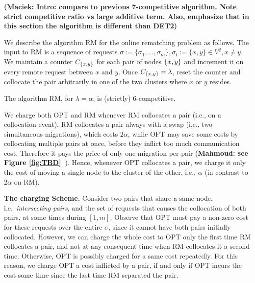 \documentclass[manuscript,screen=true, review, anonymous]{acmart}
\newcommand{\OPT}{\textsf{OPT}\xspace}
\newcommand{\RM}{\textsf{RM}\xspace} %
\DeclarePairedDelimiter\set{\{}{\}}
\newcommand\mahmoud[1]{\color{orange}\textbf{Mahmoud: #1~}\color{black}}
\newcommand\maciek[1]{\color{brown}\textbf{(Maciek: #1)}\color{black}}
\begin{document}
\maciek{Intro: compare to previous 7-competitive algorithm. Note strict competitive ratio vs large additive term. Also, emphasize that in this section the algorithm is different than DET2}

We describe the algorithm \RM for the online rematching problem as follows.
The input to \RM is a sequence of  requests
$\sigma:=\{\sigma_1,\dots, \sigma_m\}, \sigma_t:=\{x,y\} \in V^2, x \neq y$.
We maintain a counter $C_{\set{x,y}}$ for each pair of nodes $\set{x,y}$ and increment it on every remote request between $x$ and $y$.
Once $C_{\set{x,y}} = \lambda$,
reset the counter and collocate the pair arbitrarily in one of the two clusters where $x$ or $y$ resides.

\begin{theorem} \label{thm:k=2}
	The algorithm \RM, for $\lambda=\alpha$, is (strictly) 6-competitive.
\end{theorem}


We charge both \OPT and \RM whenever \RM collocates a pair (i.e., on a collocation event).
\RM collocates a pair always with a swap (i.e., two simultaneous migrations),
which  costs $2\alpha$,
while OPT may save some costs by collocating multiple pairs at once, 
 before they inflict too much communication cost.
 Therefore it pays the price of only one migration per pair  (\mahmoud{see Figure \ref{fig:TBD}}).
Hence,
whenever \OPT collocates a pair,
we charge it only the cost of moving a single node to the cluster of the other,
i.e., $\alpha$ (in contrast to $2\alpha$ on \RM).

\textbf{The charging Scheme.}
Consider two  pairs that share a same node, 
i.e.~\emph{intersecting pairs},
and the set of requests that causes the collocation of both pairs,
at some  times during  $[1,m]$.
Observe that \OPT must pay a non-zero cost
for these requests over the entire $\sigma$,
since it cannot have both pairs initially collocated.
%
%
However,
we can charge the whole cost to \OPT only the first time \RM collocates a pair,
and not at any consequent time when \RM collocates it a second time.
Otherwise,
 \OPT is possibly charged for a same cost repeatedly.
For this reason,
we charge \OPT a cost inflicted by a pair,
if and only if  \OPT incurs the cost some time since the last time \RM separated the pair.
\end{document}
